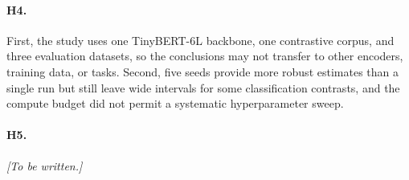 \paragraph{H4.}
First, the study uses one TinyBERT-6L backbone, one contrastive corpus, and
three evaluation datasets, so the conclusions may not transfer to other
encoders, training data, or tasks.  Second, five seeds provide more robust
estimates than a single run but still leave wide intervals for some
classification contrasts, and the compute budget did not permit a systematic
hyperparameter sweep.

\paragraph{H5.}
\textit{[To be written.]}
